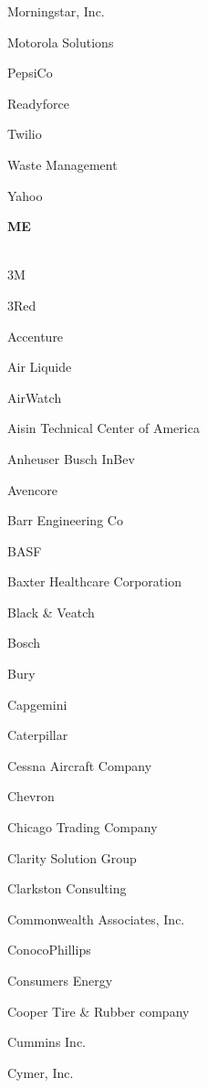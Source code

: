 \documentclass[twoside]{article}
\begin{document}
\begin{center}
\begin{multicols}{5}
\begin{FlushLeft}
\begin{compactitem}
\item Morningstar, Inc.
\item Motorola Solutions
\item PepsiCo
\item Readyforce
\item Twilio
\item Waste Management
\item Yahoo
\end{compactitem}
        \end{FlushLeft}
        \vspace{1em}
        {\fontsize{14}{16}\selectfont \bf ME}\\
        \vspace{-1em}
        ~\hrulefill~
        \vspace{-.9em}
        \begin{FlushLeft}
        \begin{compactitem}
        \item 3M
\item 3Red
\item Accenture
\item Air Liquide
\item AirWatch
\item Aisin Technical Center of America
\item Anheuser Busch InBev
\item Avencore
\item Barr Engineering Co
\item BASF
\item Baxter Healthcare Corporation
\item Black \& Veatch
\item Bosch
\item Bury
\item Capgemini
\item Caterpillar
\item Cessna Aircraft Company
\item Chevron
\item Chicago Trading Company
\item Clarity Solution Group
\item Clarkston Consulting
\item Commonwealth Associates, Inc.
\item ConocoPhillips
\item Consumers Energy
\item Cooper Tire \& Rubber company
\item Cummins Inc.
\item Cymer, Inc.

\end{compactitem}
\end{FlushLeft}
\end{multicols}
\end{center}
\end{document}
